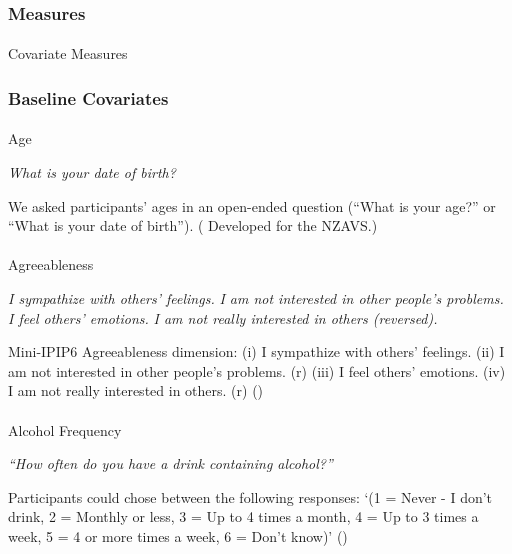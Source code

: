 \documentclass[
  single column]{article}
\makeatletter
\let\oldparagraph\paragraph
\renewcommand{\paragraph}{
    \@ifstar
      \xxxParagraphStar
      \xxxParagraphNoStar
  }
\newcommand{\xxxParagraphStar}[1]{\oldparagraph*{#1}\mbox{}}
\newcommand{\xxxParagraphNoStar}[1]{\oldparagraph{#1}\mbox{}}
\makeatother
\begin{document}
\subsubsection{Measures}\label{measures}

\paragraph{Covariate Measures}\label{covariate-measures}

\subsubsection{Baseline Covariates}\label{baseline-covariates}

\paragraph{Age}\label{age}

\emph{What is your date of birth?}

We asked participants' ages in an open-ended question (``What is your
age?'' or ``What is your date of birth'').
( Developed for the
NZAVS.)

\paragraph{Agreeableness}\label{agreeableness}

\emph{I sympathize with others' feelings.} \emph{I am not interested in
other people's problems.} \emph{I feel others' emotions.} \emph{I am not
really interested in others (reversed).}

Mini-IPIP6 Agreeableness dimension: (i) I sympathize with others'
feelings. (ii) I am not interested in other people's problems. (r) (iii)
I feel others' emotions. (iv) I am not really interested in others. (r)
()

\paragraph{Alcohol Frequency}\label{alcohol-frequency}

\emph{``How often do you have a drink containing alcohol?''}

Participants could chose between the following responses: `(1 = Never -
I don't drink, 2 = Monthly or less, 3 = Up to 4 times a month, 4 = Up to
3 times a week, 5 = 4 or more times a week, 6 = Don't know)'
()
\end{document}
